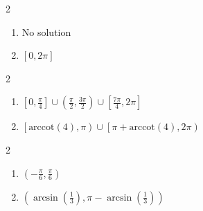 \documentclass{ximera}
\begin{document}
\begin{multicols}{2}

\begin{enumerate}

\setcounter{enumi}{\value{HW}}

\item No solution
\item $[0, 2\pi]$

\setcounter{HW}{\value{enumi}}

\end{enumerate}

\end{multicols}

\begin{multicols}{2}

\begin{enumerate}

\setcounter{enumi}{\value{HW}}

\item  $\left[0, \frac{\pi}{4} \right] \cup \left(\frac{\pi}{2}, \frac{3\pi}{2}\right) \cup \left[\frac{7\pi}{4}, 2\pi\right]$
\item  $\left[\text{arccot}(4), \pi \right) \cup \left[ \pi + \text{arccot}(4), 2\pi\right)$ 

\setcounter{HW}{\value{enumi}}

\end{enumerate}

\end{multicols}

\begin{multicols}{2}

\begin{enumerate}

\setcounter{enumi}{\value{HW}}

\item $\left( -\frac{\pi}{6}, \frac{\pi}{6} \right)$ 
\item  $\left( \arcsin\left(\frac{1}{3}\right), \pi - \arcsin\left(\frac{1}{3}\right) \right)$ 

\setcounter{HW}{\value{enumi}}

\end{enumerate}

\end{multicols}
\end{document}
